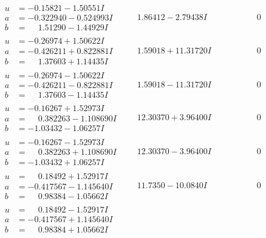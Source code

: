 \documentclass[1p]{elsarticle_modified}
\theoremstyle{definition}
\begin{document}
$$\begin{array}{c|c|c}
\begin{aligned}
u &= -0.15821 - 1.50551 I \\
a &= -0.322940 - 0.524993 I \\
b &= \phantom{-}1.51290 - 1.44929 I\end{aligned}
 & \phantom{-}1.86412 - 2.79438 I & \phantom{-0.000000 } 0 \\ \hline\begin{aligned}
u &= -0.26974 + 1.50622 I \\
a &= -0.426211 + 0.822881 I \\
b &= \phantom{-}1.37603 + 1.14435 I\end{aligned}
 & \phantom{-}1.59018 + 11.31720 I & \phantom{-0.000000 } 0 \\ \hline\begin{aligned}
u &= -0.26974 - 1.50622 I \\
a &= -0.426211 - 0.822881 I \\
b &= \phantom{-}1.37603 - 1.14435 I\end{aligned}
 & \phantom{-}1.59018 - 11.31720 I & \phantom{-0.000000 } 0 \\ \hline\begin{aligned}
u &= -0.16267 + 1.52973 I \\
a &= \phantom{-}0.382263 - 1.108690 I \\
b &= -1.03432 - 1.06257 I\end{aligned}
 & \phantom{-}12.30370 + 3.96400 I & \phantom{-0.000000 } 0 \\ \hline\begin{aligned}
u &= -0.16267 - 1.52973 I \\
a &= \phantom{-}0.382263 + 1.108690 I \\
b &= -1.03432 + 1.06257 I\end{aligned}
 & \phantom{-}12.30370 - 3.96400 I & \phantom{-0.000000 } 0 \\ \hline\begin{aligned}
u &= \phantom{-}0.18492 + 1.52917 I \\
a &= -0.417567 - 1.145640 I \\
b &= \phantom{-}0.98384 - 1.05662 I\end{aligned}
 & \phantom{-}11.7350 - 10.0840 I & \phantom{-0.000000 } 0 \\ \hline\begin{aligned}
u &= \phantom{-}0.18492 - 1.52917 I \\
a &= -0.417567 + 1.145640 I \\
b &= \phantom{-}0.98384 + 1.05662 I\end{aligned}

\end{array}$$
\end{document}
